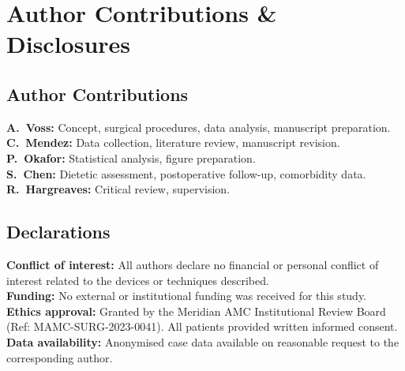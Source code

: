 \documentclass[11pt,a4paper]{article}
\begin{document}
\vspace{8pt}

\section{Author Contributions \& Disclosures}

\begin{minipage}[t]{0.47\textwidth}
  \subsection*{Author Contributions}
  \small
  \textbf{A.~Voss:} Concept, surgical procedures, data analysis, manuscript preparation.\\
  \textbf{C.~Mendez:} Data collection, literature review, manuscript revision.\\
  \textbf{P.~Okafor:} Statistical analysis, figure preparation.\\
  \textbf{S.~Chen:} Dietetic assessment, postoperative follow-up, comorbidity data.\\
  \textbf{R.~Hargreaves:} Critical review, supervision.
\end{minipage}%
\hfill%
\begin{minipage}[t]{0.47\textwidth}
  \subsection*{Declarations}
  \small
  \textbf{Conflict of interest:} All authors declare no financial or personal
  conflict of interest related to the devices or techniques described.\\[4pt]
  \textbf{Funding:} No external or institutional funding was received for this study.\\[4pt]
  \textbf{Ethics approval:} Granted by the Meridian AMC Institutional Review Board
  (Ref: MAMC-SURG-2023-0041). All patients provided written informed consent.\\[4pt]
  \textbf{Data availability:} Anonymised case data available on reasonable
  request to the corresponding author.
\end{minipage}

\vspace{8pt}

\end{document}
